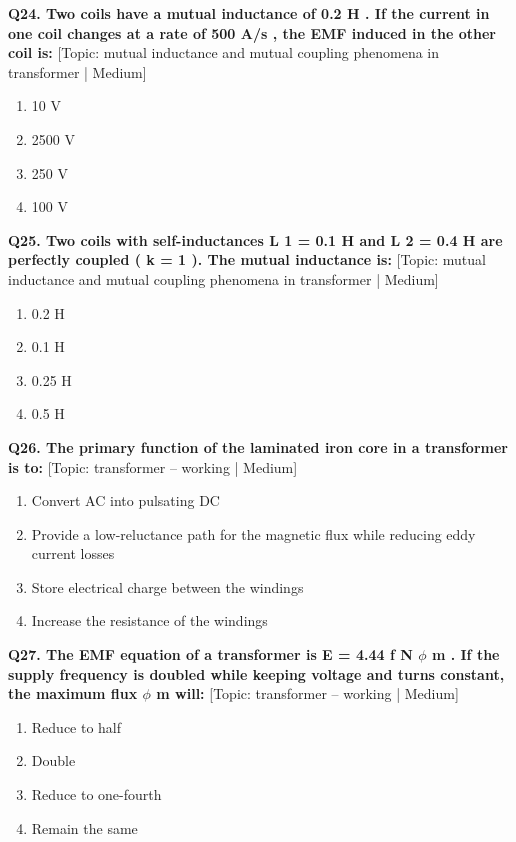 \noindent\textbf{Q24. Two coils have a mutual inductance of 0.2 H . If the current in one coil changes at a rate of 500 A/s , the EMF induced in the other coil is:} \hfill [Topic: mutual inductance and mutual coupling phenomena in transformer | Medium]
\begin{enumerate}[label=(\alph*),topsep=2pt,itemsep=1pt,partopsep=0pt,parsep=0pt]
    \item {10 V}
    \item {2500 V}
    \item {250 V}
    \item {100 V}
\end{enumerate}
\vspace{2mm}

\noindent\textbf{Q25. Two coils with self-inductances L 1 = 0.1 H and L 2 = 0.4 H are perfectly coupled ( k = 1 ). The mutual inductance is:} \hfill [Topic: mutual inductance and mutual coupling phenomena in transformer | Medium]
\begin{enumerate}[label=(\alph*),topsep=2pt,itemsep=1pt,partopsep=0pt,parsep=0pt]
    \item {0.2 H}
    \item {0.1 H}
    \item {0.25 H}
    \item {0.5 H}
\end{enumerate}
\vspace{2mm}

\noindent\textbf{Q26. The primary function of the laminated iron core in a transformer is to:} \hfill [Topic: transformer -- working | Medium]
\begin{enumerate}[label=(\alph*),topsep=2pt,itemsep=1pt,partopsep=0pt,parsep=0pt]
    \item {Convert AC into pulsating DC}
    \item {Provide a low-reluctance path for the magnetic flux while reducing eddy current losses}
    \item {Store electrical charge between the windings}
    \item {Increase the resistance of the windings}
\end{enumerate}
\vspace{2mm}

\noindent\textbf{Q27. The EMF equation of a transformer is E = 4.44 f N $\phi$ m . If the supply frequency is doubled while keeping voltage and turns constant, the maximum flux $\phi$ m will:} \hfill [Topic: transformer -- working | Medium]
\begin{enumerate}[label=(\alph*),topsep=2pt,itemsep=1pt,partopsep=0pt,parsep=0pt]
    \item {Reduce to half}
    \item {Double}
    \item {Reduce to one-fourth}
    \item {Remain the same}
\end{enumerate}
\vspace{2mm}

